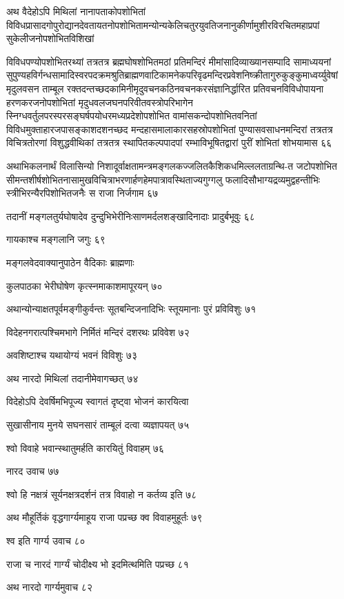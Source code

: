 अथ वैदेहोऽपि मिथिलां नानापताकोपशोभितां
विविधप्रासादगोपुरोद्यानदेवतायतनोपशोभितामन्योन्यकेलिचतुरयुवतिजनानुकीर्णामुशीरविरचितमहाप्रपां
सुकेलीजनोपशोभितविशिखां

विविधपण्योपशोभितरथ्यां तत्रतत्र ब्रह्मघोषशोभितमठां प्रतिमन्दिरं मीमांसादिव्याख्यानसम्पादि
सामाध्ययनां
सुपुण्यहविर्गन्धसामादिस्वरपदक्रमश्रुतिब्राह्मणवाटिकामनेकपरिवृढमन्दिरप्रवेशनिष्क्रीतागुरुकुङ्कुमाध्वर्य्युवेषां
मृदुलवसन ताम्बूल रक्तदन्तच्छदकामिनीमृदुवचनकठिनवचनकरसंज्ञानिर्द्धारित प्रतिवचनविविधोपायना
हरणकरजनोपशोभितां मृदुधवलजघनपरिवीतवस्त्रोपरिभागेन
स्निग्धवर्तुलपरस्परसङ्घर्षपयोधरमध्यप्रदेशोपशोभित वामांसकन्दोपशोभितवनितां
विविधमुक्ताहारजपासङ्काशदशनच्छद मन्दहासमालाकारसहस्रोपशोभितां पुण्यासवसाधनमन्दिरां
तत्रतत्र विचित्रतोरणां विशुद्धवीथिकां तत्रतत्र स्थापितकल्पपादपां रम्भाविभूषितद्वारां पुरीं
शोभितां शोभयामास ६६

अथाभिकलनार्थं विलासिन्यो निशादूर्वाक्षतामन्त्रमङ्गलकज्जलितकैशिकधमिल्ललताग्रन्थि-त
जटोपशोभित सीमन्तशीर्षशोभितनासामुखविचित्राभरणार्हणहेमपात्रावस्थिताज्यगुग्गलु
फलादिसौभाग्यद्रव्यमुद्वहन्तीभिः स्त्रीभिरन्यैरपिशोभितजनैः स राजा निर्जगाम ६७

तदानीं मङ्गलतुर्यघोषादेव दुन्दुभिभेरीनिःसाणमर्दलशङ्खादिनादाः प्रादुर्बभूवुः ६८

गायकाश्च मङ्गलानि जगुः ६९

मङ्गलवेदवाक्यानुपाठेन वैदिकाः ब्राह्मणाः

कुलपाठका भेरीघोषेण कृत्स्नमाकाशमापूरयन् ७०

अथान्योन्याक्षतपूर्वमङ्गीकुर्वन्तः सूतबन्दिजनादिभिः स्तूयमानाः पुरं प्रविविशुः ७१

विदेहनगरात्पश्चिमभागे निर्मितं मन्दिरं दशरथः प्रविवेश ७२

अवशिष्टाश्च यथायोग्यं भवनं विविशुः ७३

अथ नारदो मिथिलां तदानीमेवागच्छत् ७४

विदेहोऽपि देवर्षिमभिपूज्य स्वागतं दृष्ट्वा भोजनं कारयित्वा

सुखासीनाय मुनये सघनसारं ताम्बूलं दत्वा व्यज्ञापयत् ७५

श्वो विवाहे भवान्स्थातुमर्हति कारयितुं विवाहम् ७६

नारद उवाच ७७

श्वो हि नक्षत्रं सूर्यनक्षत्रदर्शनं तत्र विवाहो न कर्तव्य इति ७८

अथ मौहूर्तिकं वृद्धगार्ग्यमाहूय राजा पप्रच्छ क्व विवाहमुहूर्तः ७९

श्व इति गार्ग्य उवाच ८०

राजा च नारदं गार्ग्यं चोदीक्ष्य भो इदमित्थमिति पप्रच्छ ८१

अथ नारदो गार्ग्यमुवाच ८२

